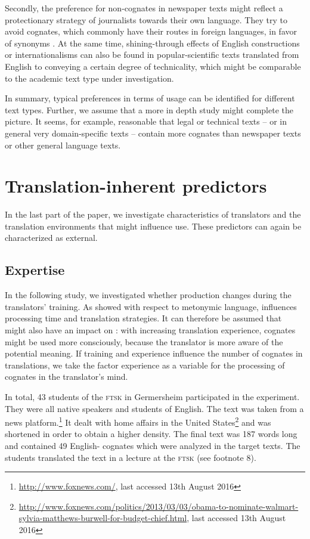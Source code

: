 \documentclass[output=paper]{LSP/langsci}
\begin{document}
\newpage 
Secondly, the preference for non-cognates in newspaper texts might reflect a protectionary strategy of journalists towards their own language. They try to avoid cognates, which commonly have their routes in foreign languages, in favor of  synonyms \citep{Liesem2014}. At the same time, shining-through effects of English constructions or internationalisms can also be found in popular-scientific texts translated from English to  \citep{HansenSchirraetal2012} conveying a certain degree of technicality, which might be comparable to the academic text type under investigation.

In summary, typical preferences in terms of  usage can be identified for different text types. Further, we assume that a more in depth study might complete the picture. It seems, for example, reasonable that legal or technical texts – or in general very domain-specific texts – contain more cognates than newspaper texts or other general language texts.

\section{Translation-inherent predictors}\label{hansenschirraetal:sec:4}
In the last part of the paper, we investigate characteristics of translators and the translation environments that might influence  use. These predictors can again be characterized as external.

\subsection{Expertise}\label{hansenschirraetal:sec:4.1}
In the following study, we investigated whether  production changes during the translators’ training. As \citet{Vandepitteetal2015} showed with respect to metonymic language,  influences processing time and translation strategies. It can therefore be assumed that  might also have an impact on : with increasing translation experience, cognates might be used more consciously, because the translator is more aware of the potential meaning. If training and experience influence the number of cognates in translations, we take the factor experience as a variable for the processing of cognates in the translator's mind.

In total, 43 students of the \textsc{ftsk} in Germersheim participated in the experiment. They were all  native speakers and students of English. The text was taken from a news platform.\footnote{\url{http://www.foxnews.com/}, last accessed 13th August 2016} It dealt with home affairs in the United States\footnote{\url{http://www.foxnews.com/politics/2013/03/03/obama-to-nominate-walmart-sylvia-matthews-burwell-for-budget-chief.html}, last accessed 13th August 2016} and was shortened in order to obtain a higher  density. The final text was 187 words long and contained 49 English- cognates which were analyzed in the target texts. The students translated the text in a lecture at the \textsc{ftsk} (see footnote 8). 
\end{document}
